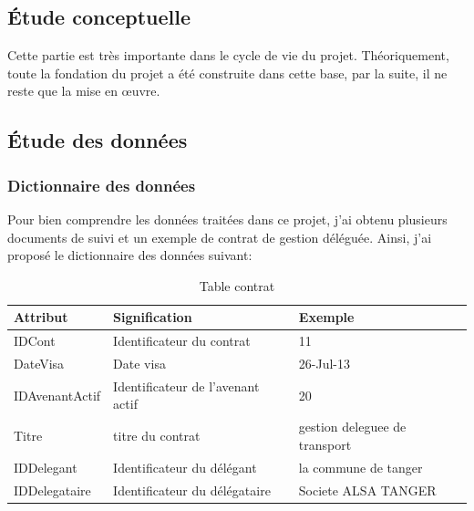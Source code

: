 \documentclass[a4paper]{report}
\begin{document}
\begin{doublespace}
	\chapter{Étude conceptuelle}
	\renewcommand{\headrulewidth}{1pt}
	\fancyhead[L]{\hspace*{5cm}}
	Cette partie est très importante dans le cycle de vie du projet. Théoriquement, toute la fondation du projet a été construite dans cette base, par la suite, il ne reste que la mise en œuvre.
	\section{Étude des données}
	\subsection{Dictionnaire des données}
	Pour bien comprendre les données traitées dans ce projet, j'ai obtenu plusieurs documents de suivi et un exemple de contrat de gestion déléguée. Ainsi, j'ai proposé le dictionnaire des données suivant:
	\begin{table}[H]
		\begin{center}
			\begin{tabularx}{17.5cm}{|X|X|X|}
				\hline
				\textbf{Attribut} & \textbf{Signification}            &
				\textbf{Exemple}                                                            \\
				\hline
				IDCont            & Identificateur du contrat         & 11                  \\
				\hline
				DateVisa          & Date visa                         & 26-Jul-13           \\
				\hline
				IDAvenantActif    & Identificateur de l'avenant actif &
				20                                                                          \\
				\hline
				Titre             & titre du contrat                  & gestion deleguee de
				transport                                                                   \\
				\hline
				IDDelegant        & Identificateur du délégant        & la commune de
				tanger                                                                      \\
				\hline
				IDDelegataire     & Identificateur du délégataire     & Societe ALSA
				TANGER                                                                      \\
				\hline
			\end{tabularx}
			\caption{Table contrat}
		\end{center}
	\end{table}


\end{doublespace}
\end{document}
